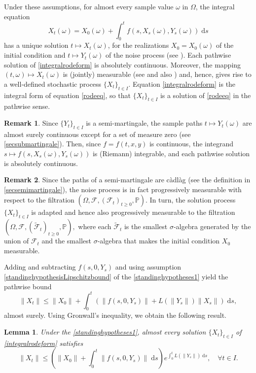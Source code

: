 \documentclass[reqno,12pt]{amsart}
\theoremstyle{plain} %
\newtheorem{lemma}{Lemma}[section]
\theoremstyle{definition} %
\newtheorem{remark}{Remark}[section]
\begin{document}
Under these assumptions, for almost every sample value $\omega$ in $\Omega$, the integral equation
\begin{equation}
    \label{integralrodeform}
    X_t(\omega) = X_0(\omega) + \int_0^t f(s, X_s(\omega), Y_s(\omega)) \;\mathrm{d}s
\end{equation}
has a unique solution $t\mapsto X_t(\omega)$, for the realizations $X_0 = X_0(\omega)$ of the initial condition and $t\mapsto Y_t(\omega)$ of the noise process (see \cite[Theorem 1.1]{CoddingtonLevinson1985}). Each pathwise solution of \cref{integralrodeform} is absolutely continuous. Moreover, the mapping $(t, \omega) \mapsto X_t(\omega)$ is (jointly) measurable (see \cite[Section 2.1.2]{HanKloeden2017} and also \cite[Lemma 4.51]{AB2006}) and, hence, {gives} rise to a well-defined stochastic process $\{X_t\}_{t\in I}.$ Equation \eqref{integralrodeform} is the integral form of equation \eqref{rodeeq}, so that $\{X_t\}_{t\in I}$ is a solution of \eqref{rodeeq} in the pathwise sense.

\begin{remark}
    Since $\{Y_t\}_{t\in I}$ is a semi-martingale, the sample paths $t \mapsto Y_t(\omega)$ are almost surely continuous except for a set of measure zero (see \cref{secsubmartingale}). Then, since $f=f(t, x, y)$ is continuous, the integrand $s \mapsto f(s, X_s(\omega), Y_s(\omega))$ is (Riemann) integrable, and each pathwise solution is absolutely continuous.
\end{remark}

\begin{remark}
    Since the paths of a semi-martingale are c\`adl\`ag (see the definition in \cref{secsemimartingale}), the noise process is in fact progressively measurable with respect to the filtration $(\Omega, \mathcal{F}, (\mathcal{F}_t)_{t\geq 0}, \mathbb{P}).$ In turn, the solution process $\{X_t\}_{t\in I}$ is adapted and hence also progressively measurable to the filtration $(\Omega, \mathcal{F}, (\tilde{\mathcal{F}}_t)_{t\geq 0}, \mathbb{P}),$ where each $\tilde{\mathcal{F}}_t$ is the smallest $\sigma$-algebra generated by the union of $\mathcal{F}_t$ and the smallest $\sigma$-algebra that makes the initial condition $X_0$ measurable.
\end{remark}

Adding and subtracting $f(s, 0, Y_s)$ and using assumption \eqref{standinghypothesisLipschitzbound} of the \cref{standinghypotheses1} yield the pathwise bound
\[
    \|X_t\| \leq \|X_0\| + \int_0^t \left(\|f(s, 0, Y_s)\| + L(\|Y_s\|)\|X_s\|\right)\;\mathrm{d}s,
\]
almost surely. Using Gronwall's inequality, we obtain the following result.
\begin{lemma}
    Under the \cref{standinghypotheses1}, almost every solution $\{X_t\}_{t\in I}$ of \cref{integralrodeform} satisfies
    \begin{equation}
        \label{XtboundLXMt}
        \|X_t\| \leq \left(\|X_0\| + \int_0^t \|f(s, 0, Y_s)\|\;\mathrm{d}s\right) e^{\int_0^t L(\|Y_s\|)\;\mathrm{d}s}, \quad \forall t\in I.
    \end{equation}
\end{lemma}
\end{document}
